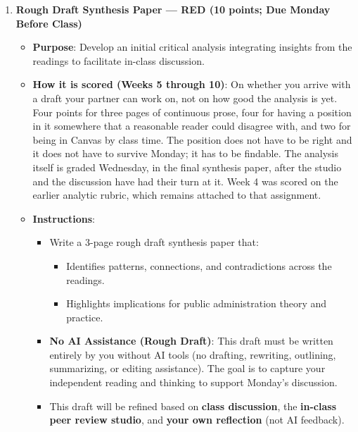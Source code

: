 \documentclass[11pt]{article}     %
\begin{document}
\begin{enumerate}
    \item \textbf{Rough Draft Synthesis Paper --- RED (10 points; Due Monday Before Class)}
    \begin{itemize}
        \item \textbf{Purpose}: Develop an initial critical analysis integrating insights from the readings to facilitate in-class discussion.
        \item \textbf{How it is scored (Weeks 5 through 10)}: On whether you arrive with a draft your partner can work on, not on how good the analysis is yet. Four points for three pages of continuous prose, four for having a position in it somewhere that a reasonable reader could disagree with, and two for being in Canvas by class time. The position does not have to be right and it does not have to survive Monday; it has to be findable. The analysis itself is graded Wednesday, in the final synthesis paper, after the studio and the discussion have had their turn at it. Week 4 was scored on the earlier analytic rubric, which remains attached to that assignment.
        \item \textbf{Instructions}:
        \begin{itemize}
            \item Write a 3-page rough draft synthesis paper that:
            \begin{itemize}
                \item Identifies patterns, connections, and contradictions across the readings.
                \item Highlights implications for public administration theory and practice.
            \end{itemize}
    
            \item \textbf{No AI Assistance (Rough Draft)}: This draft must be written entirely by you without AI tools (no drafting, rewriting, outlining, summarizing, or editing assistance). The goal is to capture your independent reading and thinking to support Monday’s discussion.
    
            \item This draft will be refined based on \textbf{class discussion}, the \textbf{in-class peer review studio}, and \textbf{your own reflection} (not AI feedback).
        \end{itemize}
    \end{itemize}


\end{enumerate}
\end{document}
